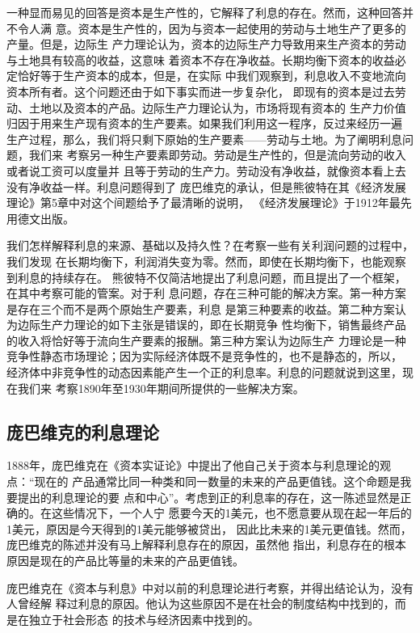 一种显而易见的回答是资本是生产性的，它解释了利息的存在。然而，这种回答并不令人满
意。资本是生产性的，因为与资本一起使用的劳动与土地生产了更多的产量。但是，边际生
产力理论认为，资本的边际生产力导致用来生产资本的劳动与土地具有较高的收益，这意味
着资本不存在净收益。长期均衡下资本的收益必定恰好等于生产资本的成本，但是，在实际
中我们观察到，利息收入不变地流向资本所有者。这个问题还由于如下事实而进一步复杂化，
即现有的资本是过去劳动、土地以及资本的产品。边际生产力理论认为，市场将现有资本的
生产力价值归因于用来生产现有资本的生产要素。如果我们利用这一程序，反过来经历一遍
生产过程，那么，我们将只剩下原始的生产要素——劳动与土地。为了阐明利息问题，我们来
考察另一种生产要素即劳动。劳动是生产性的，但是流向劳动的收入或者说工资可以度量并
且等于劳动的生产力。劳动没有净收益，就像资本看上去没有净收益一样。利息问题得到了
庞巴维克的承认，但是熊彼特在其《经济发展理论》第5章中对这个间题给予了最清晰的说明，
《经济发展理论》于1912年最先用德文出版。

我们怎样解释利息的来源、基础以及持久性？在考察一些有关利润问题的过程中，我们发现
在长期均衡下，利润消失变为零。然而，即使在长期均衡下，也能观察到利息的持续存在。
熊彼特不仅简洁地提出了利息问题，而且提出了一个框架，在其中考察可能的管案。对于利
息问题，存在三种可能的解决方案。第一种方案是存在三个而不是两个原始生产要素，利息
是第三种要素的收益。第二种方案认为边际生产力理论的如下主张是错误的，即在长期竞争
性均衡下，销售最终产品的收入将恰好等于流向生产要素的报酬。第三种方案认为边际生产
力理论是一种竞争性静态市场理论；因为实际经济体既不是竞争性的，也不是静态的，所以，
经济体中非竞争性的动态因素能产生一个正的利息率。利息的问题就说到这里，现在我们来
考察1890年至1930年期间所提供的一些解决方案。

\subsection{庞巴维克的利息理论}

1888年，庞巴维克在《资本实证论》中提出了他自己关于资本与利息理论的观点：“现在的
产品通常比同一种类和同一数量的未来的产品更值钱。这个命题是我要提出的利息理论的要
点和中心”。考虑到正的利息率的存在，这一陈述显然是正确的。在这些情况下，一个人宁
愿要今天的1美元，也不愿意要从现在起一年后的1美元，原因是今天得到的1美元能够被贷出，
因此比未来的1美元更值钱。然而，庞巴维克的陈述并没有马上解释利息存在的原因，虽然他
指出，利息存在的根本原因是现在的产品比等量的未来的产品更值钱。

庞巴维克在《资本与利息》中对以前的利息理论进行考察，并得出结论认为，没有人曾经解
释过利息的原因。他认为这些原因不是在社会的制度结构中找到的，而是在独立于社会形态
的技术与经济因素中找到的。

